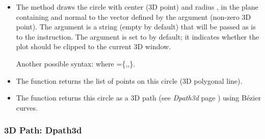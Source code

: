 \begin{itemize}
    \item The method  draws the circle with center  (3D point) and radius , in the plane containing  and normal to the vector defined by the argument  (non-zero 3D point). The  argument is a string (empty by default) that will be passed as is to the \drawcmd instruction. The  argument is set to \false by default; it indicates whether the plot should be clipped to the current 3D window.

Another possible syntax:  where =\{,,\}.

    \item The  function returns the list of points on this circle (3D polygonal line).

    \item The  function returns this circle as a 3D path (see \emph{Dpath3d} page \pageref{Dpath3d}) using Bézier curves.
\end{itemize}

\subsubsection{3D Path: Dpath3d}\label{Dpath3d}

